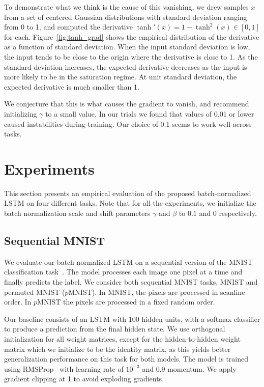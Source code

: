 \documentclass{article} %
\begin{document}
To demonstrate what we think is the cause of this vanishing, we drew samples $x$ from a set of centered Gaussian distributions with standard deviation ranging from 0 to 1, and computed the derivative $\tanh'(x) = 1 - \tanh^2(x) \in [0, 1]$ for each.
Figure~\ref{fig:tanh_grad} shows the empirical distribution of the derivative as a function of standard deviation.
When the input standard deviation is low, the input tends to be close to the origin where the derivative is close to 1.
As the standard deviation increases, the expected derivative decreases as the input is more likely to be in the saturation regime.
At unit standard deviation, the expected derivative is much smaller than 1.

We conjecture that this is what causes the gradient to vanish, and recommend initializing $\gamma$ to a small value.
In our trials we found that values of 0.01 or lower caused instabilities during training.
Our choice of 0.1 seems to work well across tasks.

\section{Experiments}
\label{sec:experiments}

This section presents an empirical evaluation of the proposed batch-normalized LSTM on four different tasks.
Note that for all the experiments, we initialize the batch normalization scale and shift parameters $\gamma$ and $\beta$ to $0.1$ and $0$ respectively.

\subsection{Sequential MNIST}
\label{sec:seqmnist}

We evaluate our batch-normalized LSTM on a sequential version of the MNIST classification task~\citep{le2015simple}.
The model processes each image one pixel at a time and finally predicts the label.
We consider both sequential MNIST tasks, MNIST and permuted MNIST ($p$MNIST).
In MNIST, the pixels are processed in scanline order.
In $p$MNIST the pixels are processed in a fixed random order.

Our baseline consists of an LSTM with 100 hidden units, with a softmax classifier to produce a prediction from the final hidden state.
We use orthogonal initialization for all weight matrices, except for the hidden-to-hidden weight matrix which we initialize to be the identity matrix,
as this yields better generalization performance on this task for both models.
The model is trained using RMSProp~\citep{rmsprop} with learning rate of $10^{-3}$ and $0.9$ momentum.
We apply gradient clipping at 1 to avoid exploding gradients.
\end{document}
